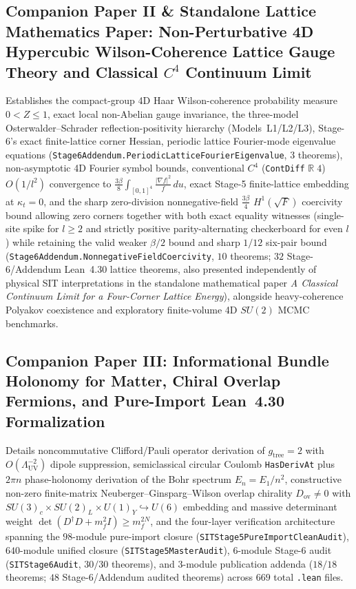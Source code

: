 \subsection{Companion Paper II \& Standalone Lattice Mathematics Paper: Non-Perturbative 4D Hypercubic Wilson-Coherence Lattice Gauge Theory and Classical $C^4$ Continuum Limit}

Establishes the compact-group 4D Haar Wilson-coherence probability measure $0 < Z \le 1$, exact local non-Abelian gauge invariance, the three-model Osterwalder--Schrader reflection-positivity hierarchy (Models~L1/L2/L3), Stage-6's exact finite-lattice corner Hessian, periodic lattice Fourier-mode eigenvalue equations (\texttt{Stage6Addendum.\allowbreak{}PeriodicLatticeFourierEigenvalue}, $3$ theorems), non-asymptotic 4D Fourier symbol bounds, conventional $C^4$ (\texttt{ContDiff} $\mathbb{R}\;4$) $O(1/l^2)$ convergence to $\frac{3\beta}{8}\int_{[0,1]^4}\frac{|\nabla f|^2}{f}\,du$, exact Stage-5 finite-lattice embedding at $\kappa_t = 0$, and the sharp zero-division nonnegative-field $\frac{3\beta}{4}$ $H^1(\sqrt{F})$ coercivity bound allowing zero corners together with both exact equality witnesses (single-site spike for $l \ge 2$ and strictly positive parity-alternating checkerboard for even $l$) while retaining the valid weaker $\beta/2$ bound and sharp $1/12$ six-pair bound (\texttt{Stage6Addendum.\allowbreak{}NonnegativeFieldCoercivity}, $10$ theorems; $32$ Stage-6/Addendum Lean~4.30 lattice theorems, also presented independently of physical SIT interpretations in the standalone mathematical paper \emph{A Classical Continuum Limit for a Four-Corner Lattice Energy}), alongside heavy-coherence Polyakov coexistence and exploratory finite-volume 4D $SU(2)$ MCMC benchmarks.

\subsection{Companion Paper III: Informational Bundle Holonomy for Matter, Chiral Overlap Fermions, and Pure-Import Lean~4.30 Formalization}

Details noncommutative Clifford/Pauli operator derivation of $g_{\mathrm{tree}} = 2$ with $O(\Lambda_{\mathrm{UV}}^{-2})$ dipole suppression, semiclassical circular Coulomb \texttt{HasDerivAt} plus $2\pi n$ phase-holonomy derivation of the Bohr spectrum $E_n = E_1/n^2$, constructive non-zero finite-matrix Neuberger--Ginsparg--Wilson overlap chirality $D_{\mathrm{ov}} \ne 0$ with $SU(3)_c\times SU(2)_L\times U(1)_Y \hookrightarrow U(6)$ embedding and massive determinant weight $\det(D^\dagger D + m_f^2 I) \ge m_f^{2N}$, and the four-layer verification architecture spanning the $98$-module pure-import closure (\texttt{SITStage5\allowbreak{}Pure\allowbreak{}Import\allowbreak{}Clean\allowbreak{}Audit}), $640$-module unified closure (\texttt{SITStage5MasterAudit}), $6$-module Stage-6 audit (\texttt{SITStage6Audit}, $30/30$ theorems), and $3$-module publication addenda ($18/18$ theorems; $48$ Stage-6/Addendum audited theorems) across $669$ total \texttt{.lean} files.

